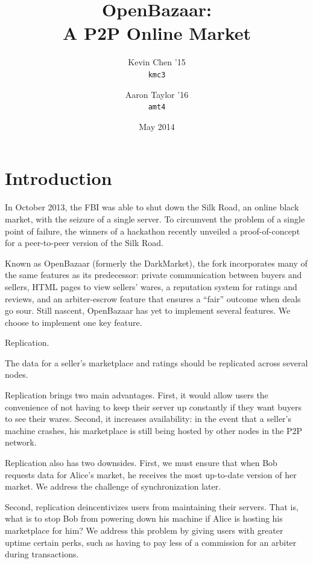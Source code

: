 \documentclass[12pt,twocolumn]{article}
\title{\bf \sc OpenBazaar: \\ A P2P Online Market}
\author{
    {\rm Kevin Chen '15} \\
    {\tt kmc3}
    \and 
    {\rm Aaron Taylor '16} \\
    {\tt amt4}
}
\date{May 2014}
\begin{document}
\maketitle

\doublespacing



\section{Introduction}
In October 2013, the FBI was able to shut down the Silk Road, an online black market, with the seizure of a single server.
To circumvent the problem of a single point of failure, the winners of a hackathon recently unveiled a proof-of-concept for a peer-to-peer version of the Silk Road.

Known as OpenBazaar (formerly the DarkMarket), the fork incorporates many of the same features as its predecessor: private communication between buyers and sellers, HTML pages to view sellers' wares, a reputation system for ratings and reviews, and an arbiter-escrow feature that ensures a ``fair'' outcome when deals go sour.
Still nascent, OpenBazaar has yet to implement several features.
We choose to implement one key feature.

Replication.

The data for a seller's marketplace and ratings should be replicated across several nodes.

Replication brings two main advantages.
First, it would allow users the convenience of not having to keep their server up constantly if they want buyers to see their wares.
Second, it increases availability: in the event that a seller's machine crashes, his marketplace is still being hosted by other nodes in the P2P network.

Replication also has two downsides.
First, we must ensure that when Bob requests data for Alice's market, he receives the most up-to-date version of her market.
We address the challenge of synchronization later.

Second, replication deincentivizes users from maintaining their servers.
That is, what is to stop Bob from powering down his machine if Alice is hosting his marketplace for him?
We address this problem by giving users with greater uptime certain perks, such as having to pay less of a commission for an arbiter during transactions.
\end{document}
